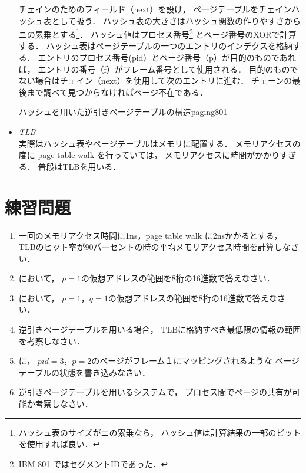 \begin{itemize}
チェインのためのフィールド（next）を設け，
ページテーブルをチェインハッシュ表として扱う．
ハッシュ表の大きさはハッシュ関数の作りやすさからニの累乗とする\footnote{
ハッシュ表のサイズがニの累乗なら，
ハッシュ値は計算結果の一部のビットを使用すれば良い．}．
ハッシュ値はプロセス番号\footnote{IBM 801 ではセグメントIDであった．}
とページ番号のXORで計算する．
ハッシュ表はページテーブルの一つのエントリのインデクスを格納する．
エントリのプロセス番号(pid）とページ番号（p）が目的のものであれば，
エントリの番号（f）がフレーム番号として使用される．
目的のものでない場合はチェイン（next）を使用して次のエントリに進む．
チェーンの最後まで調べて見つからなければページ不在である．

{ハッシュを用いた逆引きページテーブルの構造}{paging801}

\item \emph{TLB} \\
実際はハッシュ表やページテーブルはメモリに配置する．
メモリアクセスの度に page table walk を行っていては，
メモリアクセスに時間がかかりすぎる．
普段はTLBを用いる．
\end{itemize}


\section*{練習問題}

\begin{enumerate}
\item 一回のメモリアクセス時間に1ns，page table walk に2nsかかるとする，
TLBのヒット率が90パーセントの時の平均メモリアクセス時間を計算しなさい．

\item {}において，
$p=1$の仮想アドレスの範囲を8桁の16進数で答えなさい．

\item {}において，
$p=1$，$q=1$の仮想アドレスの範囲を8桁の16進数で答えなさい．

\item 逆引きページテーブルを用いる場合，
TLBに格納すべき最低限の情報の範囲を考察しなさい．

\item {}に，
$pid=3$，$p=2$のページがフレーム１にマッピングされるような
ページテーブルの状態を書き込みなさい．

\item 逆引きページテーブルを用いるシステムで，
プロセス間でページの共有が可能か考察しなさい．
\end{enumerate}
